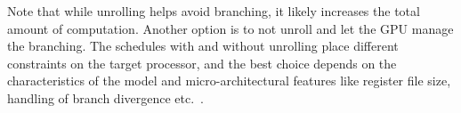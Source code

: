 Note that while unrolling helps avoid branching, it likely increases 
the total amount of computation. Another option is to not unroll 
and let the GPU manage the branching. The schedules with and 
without unrolling place different constraints on the target processor,
and the best choice depends on the characteristics of the model
and micro-architectural features like register file size, handling 
of branch divergence etc.~\cite{FungMicro, MilindDivergence}.


